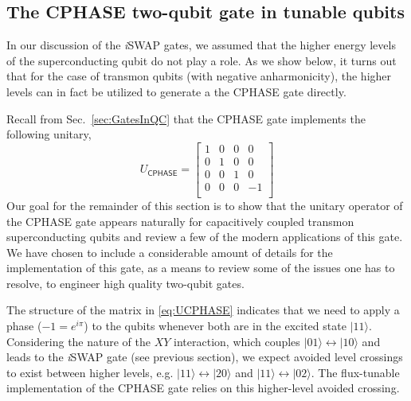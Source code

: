 \documentclass[aip,apr,twocolumn,showpacs,superscriptaddress,groupedaddress,nofootinbib,reprint]{revtex4-1}  %
\newcommand{\iSWAP}{\emph{i}\textsf{SWAP}}
\newcommand{\CPHASE}{\textsf{CPHASE}}
\begin{document}

\subsection{\label{sec:CZgates}The \textsf{CPHASE} two-qubit gate in tunable qubits}
In our discussion of the \iSWAP{} gates, we assumed that the higher energy levels of the superconducting qubit do not play a role. As we show below, it turns out that for the case of transmon qubits (with negative anharmonicity), the higher levels can in fact be utilized to generate a the \CPHASE{} gate directly\cite{Strauch2003,DiCarlo2009}.

Recall from Sec.~\ref{sec:GatesInQC} that the \CPHASE{} gate implements the following unitary,
\begin{equation}
U_\CPHASE{} = \begin{bmatrix}
1 & 0 & 0 & 0\\
0 & 1 & 0 & 0\\
0 & 0 & 1 & 0\\
0 & 0 & 0 & -1\\
\end{bmatrix}
\end{equation}
Our goal for the remainder of this section is to show that the unitary operator of the \CPHASE{} gate appears naturally for capacitively coupled transmon superconducting qubits and review a few of the modern applications of this gate. We have chosen to include a considerable amount of details for the implementation of this gate, as a means to review some of the issues one has to resolve, to engineer high quality two-qubit gates.

The structure of the matrix in \cref{eq:UCPHASE} indicates that we need to apply a phase ($-1 = e^{i\pi}$) to the qubits whenever both are in the excited state $|11\rangle$. Considering the nature of the $XY$ interaction, which couples $|01\rangle \leftrightarrow |10\rangle$ and leads to the \iSWAP{} gate (see previous section), we expect avoided level crossings to exist between higher levels, e.g. $|11\rangle \leftrightarrow |20\rangle$ and $|11\rangle \leftrightarrow |02\rangle$. The flux-tunable implementation of the \CPHASE{} gate relies on this higher-level avoided crossing.
\end{document}
